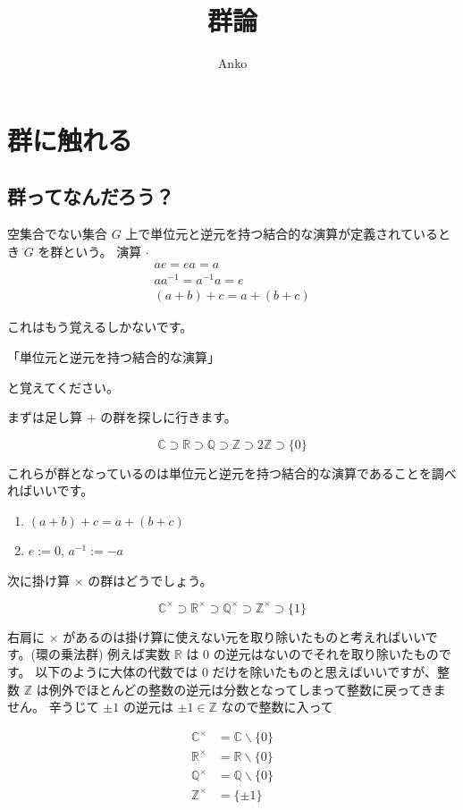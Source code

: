 \documentclass[uplatex,dvipdfmx,a4paper,11pt]{jlreq}
\title{群論}
\author{Anko}
\newcommand{\CC}{\mathbb{C}}
\newcommand{\RR}{\mathbb{R}}
\newcommand{\QQ}{\mathbb{Q}}
\newcommand{\ZZ}{\mathbb{Z}}
\theoremstyle{definition}
\begin{document}
\maketitle
\tableofcontents
\clearpage

\section{群に触れる}
\subsection{群ってなんだろう？}
\begin{definition}[群]
  空集合でない集合 $G$ 上で単位元と逆元を持つ結合的な演算が定義されているとき $G$ を群という。
  演算 $\cdot$
  \begin{align}
    ae = ea = a           \\
    aa^{-1} = a^{-1}a = e \\
    (a + b) + c = a + (b + c)
  \end{align}
\end{definition}

これはもう覚えるしかないです。

「単位元と逆元を持つ結合的な演算」

と覚えてください。

まずは足し算 $+$ の群を探しに行きます。

$$
  \CC\supset\RR\supset\QQ\supset\ZZ\supset 2\ZZ\supset\{0\}
$$

これらが群となっているのは単位元と逆元を持つ結合的な演算であることを調べればいいです。
\begin{enumerate}
  \item $(a + b) + c = a + (b + c)$
  \item $e := 0$, $a^{-1} := -a$
\end{enumerate}

次に掛け算 $\times$ の群はどうでしょう。

$$
  \CC^\times\supset\RR^\times\supset\QQ^\times\supset\ZZ^\times\supset\{1\}
$$

右肩に $\times$ があるのは掛け算に使えない元を取り除いたものと考えればいいです。(環の乗法群)
例えば実数 $\RR$ は $0$ の逆元はないのでそれを取り除いたものです。
以下のように大体の代数では $0$ だけを除いたものと思えばいいですが、整数 $\ZZ$ は例外でほとんどの整数の逆元は分数となってしまって整数に戻ってきません。
辛うじて $\pm 1$ の逆元は $\pm 1\in\ZZ$ なので整数に入って

\begin{align}
  \CC^\times & = \CC\backslash\{0\} \\
  \RR^\times & = \RR\backslash\{0\} \\
  \QQ^\times & = \QQ\backslash\{0\} \\
  \ZZ^\times & = \{\pm 1\}
\end{align}
\end{document}
